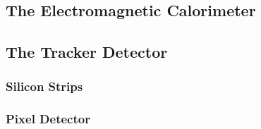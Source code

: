 \subsection{The Electromagnetic Calorimeter}
\subsection{The Tracker Detector}
\subsubsection{Silicon Strips}
\subsubsection{Pixel Detector}



























